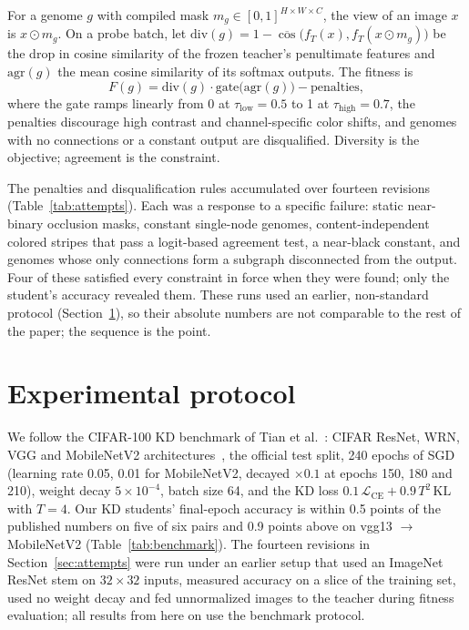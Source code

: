 \documentclass[sigconf,review,anonymous]{acmart}
\begin{document}
For a genome $g$ with compiled mask $m_g \in [0,1]^{H\times W\times C}$,
the view of an image $x$ is $x \odot m_g$. On a probe batch, let
$\mathrm{div}(g) = 1 - \overline{\cos}\big(f_T(x), f_T(x\odot m_g)\big)$ be
the drop in cosine similarity of the frozen teacher's penultimate features
and $\mathrm{agr}(g)$ the mean cosine similarity of its softmax outputs.
The fitness is
\[
F(g) = \mathrm{div}(g)\cdot \mathrm{gate}\big(\mathrm{agr}(g)\big) - \text{penalties},
\]
where the gate ramps linearly from 0 at $\tau_{\mathrm{low}}=0.5$ to 1 at
$\tau_{\mathrm{high}}=0.7$, the penalties discourage high contrast and
channel-specific color shifts, and genomes with no connections or a
constant output are disqualified. Diversity is the objective; agreement is
the constraint.

The penalties and disqualification rules accumulated over fourteen
revisions (Table~\ref{tab:attempts}). Each was a response to a specific
failure: static near-binary occlusion masks, constant single-node genomes,
content-independent colored stripes that pass a logit-based agreement test,
a near-black constant, and genomes whose only connections form a subgraph
disconnected from the output. Four of these satisfied every constraint in
force when they were found; only the student's accuracy revealed them.
These runs used an earlier, non-standard protocol (Section~\ref{sec:protocol}),
so their absolute numbers are not comparable to the rest of the paper; the
sequence is the point.

\begin{table}
\caption{Fourteen revisions of the teacher-only fitness (CIFAR-10,
ResNet-18, legacy protocol; mean test top-1 over 3 seeds). Bold: degenerate
solutions that satisfied every constraint in force.}
\label{tab:attempts}
\small

\end{table}

\section{Experimental protocol}
\label{sec:protocol}

We follow the CIFAR-100 KD benchmark of Tian et
al.~\cite{tian2020crd}: CIFAR ResNet, WRN, VGG and MobileNetV2
architectures~\cite{he2016resnet,zagoruyko2016wrn,simonyan2015vgg,sandler2018mobilenetv2},
the official test split, 240 epochs of SGD (learning rate 0.05, 0.01 for
MobileNetV2, decayed $\times 0.1$ at epochs 150, 180 and 210), weight decay
$5\times10^{-4}$, batch size 64, and the KD loss
$0.1\,\mathcal{L}_{\mathrm{CE}} + 0.9\,T^2\,\mathrm{KL}$ with $T=4$. Our KD
students' final-epoch accuracy is within 0.5 points of the published
numbers on five of six pairs and 0.9 points above on vgg13 $\to$
MobileNetV2 (Table~\ref{tab:benchmark}). The fourteen revisions in
Section~\ref{sec:attempts} were run under an earlier setup that used an
ImageNet ResNet stem on $32\times32$ inputs, measured accuracy on a slice
of the training set, used no weight decay and fed unnormalized images to
the teacher during fitness evaluation; all results from here on use the
benchmark protocol.
\end{document}
